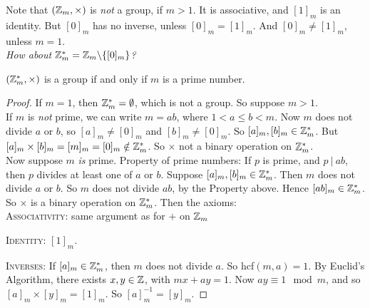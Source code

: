 \documentclass[twoside]{scrartcl}
\begin{document}
Note that $(\mathbb{Z}_m,\times)$ is \emph{not} a group, if $m > 1$. It is associative, and $[1]_m$ is an identity. But $[0]_m$ has no inverse, unless $[0]_m = [1]_m$. And $[0]_m \neq [1]_m$, unless $m =1 $.\\

\textit{How about $\mathbb{Z}^{*}_m = \mathbb{Z}_m \backslash\{[0]_m\}$?}\\

\begin{proposition}$(\mathbb{Z}_m^{*},\times)$ is a group if and only if $m$ is a prime number.	
\end{proposition}


\begin{proof}
If $m = 1$, then $\mathbb{Z}_m^* = \emptyset$, which is not a group. So suppose $m > 1$.\\ If $m$ is \emph{not} prime, we can write $m = ab$, where $1 < a \leq b < m$. Now $m$ does not divide $a$ or $b$, so $[a]_m \neq [0]_m$ and $[b]_m \neq [0]_m$. So $[a]_m, [b]_m \in \mathbb{Z}_m^*$. But $[a]_m \times [b]_m = [m]_m = [0]_m \notin \mathbb{Z}_m^*$. So $\times$ not a binary operation on $\mathbb{Z}_m^*$. \\

Now suppose $m$ \emph{is} prime. Property of prime numbers: If $p$ is prime, and $p ~|~ ab$, then $p$ divides at least one of $a$ or $b$. Suppose $[a]_m,[b]_m \in \mathbb{Z}_m^*$. Then $m$ does not divide $a$ or $b$. So $m$ does not divide $ab$, by the Property above. Hence $[ab]_m \in \mathbb{Z}_m^*$. So $\times$ is a binary operation on $\mathbb{Z}_m^*$. Then the axioms:\\

\textsc{Associativity:} same argument as for $+$ on $\mathbb{Z}_m$\\ \vspace*{-10pt}

\textsc{Identity:} $[1]_m$.\\ \vspace*{-10pt}

\textsc{Inverses:} If $[a]_m \in \mathbb{Z}_m^*$, then $m$ does not divide $a$. So hcf$(m,a)= 1$. By Euclid's Algorithm, there exists $x,y \in \mathbb{Z}$, with $mx + ay = 1$. Now $ay \equiv 1 \mod m$, and so $[a]_m\times [y]_m = [1]_m$. So $[a]_m^{-1} = [y]_m$.
\end{proof}\vspace*{10pt}
\end{document}
